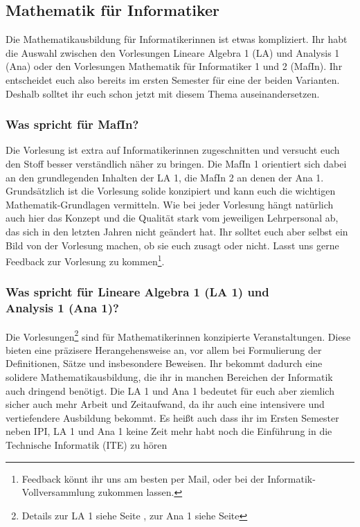 \subsection{Mathematik für Informatiker}
Die Mathematikausbildung für Informatikerinnen ist etwas kompliziert. Ihr habt die Auswahl zwischen den Vorlesungen Lineare Algebra 1 (\gls{LA}) und Analysis 1 (\gls{Ana}) oder den Vorlesungen Mathematik für Informatiker 1 und 2 (\gls{MafIn}). Ihr entscheidet euch also bereits im ersten Semester für eine der beiden Varianten. Deshalb solltet ihr euch schon jetzt mit diesem Thema auseinandersetzen.
\subsubsection{Was spricht für MafIn?}
Die Vorlesung ist extra auf Informatikerinnen zugeschnitten und versucht euch den Stoff besser verständlich näher zu bringen. Die MafIn 1 orientiert sich dabei an den grundlegenden Inhalten der LA 1, die MafIn 2 an denen der Ana 1. Grundsätzlich ist die Vorlesung solide konzipiert und kann euch die wichtigen Mathematik-Grundlagen vermitteln. Wie bei jeder Vorlesung hängt natürlich auch hier das Konzept und die Qualität stark vom jeweiligen Lehrpersonal ab, das sich in den letzten Jahren nicht geändert hat. Ihr solltet euch aber selbst ein Bild von der Vorlesung machen, ob sie euch zusagt oder nicht. Lasst uns gerne Feedback zur Vorlesung zu kommen\footnote{Feedback könnt ihr uns am besten per Mail, oder bei der Informatik-Vollversammlung zukommen lassen.}.
\subsubsection{Was spricht für Lineare Algebra 1 (LA 1) und \\Analysis 1 (Ana 1)?}
Die Vorlesungen\footnote{Details zur LA 1 siehe Seite \pageref{la1}, zur Ana 1 siehe Seite \pageref{ana1}} sind für Mathematikerinnen konzipierte Veranstaltungen. Diese bieten eine präzisere Herangehensweise an, vor allem bei Formulierung der Definitionen, Sätze und insbesondere Beweisen. Ihr bekommt dadurch eine solidere Mathematikausbildung, die ihr in manchen Bereichen der Informatik auch dringend benötigt. Die LA 1 und Ana 1 bedeutet für euch aber ziemlich sicher auch mehr Arbeit und Zeitaufwand, da ihr auch eine intensivere und vertiefendere Ausbildung bekommt. Es heißt auch dass ihr im Ersten Semester neben \gls{IPI}, LA 1 und Ana 1 keine Zeit mehr habt noch die Einführung in die Technische Informatik (\gls{ITE}) zu hören\\


